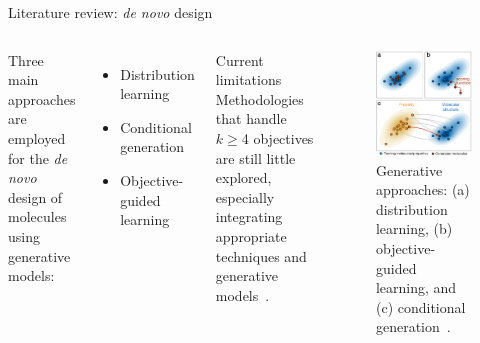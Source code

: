 \documentclass[aspectratio=169,xcolor=dvipsnames]{beamer}
\begin{document}
\begin{frame}{Literature review: \textit{de novo} design}
    \begin{columns}[c]
        Three main approaches are employed for the \textit{de novo} design of molecules using generative models:
        \begin{itemize}
            \item Distribution learning
            \item Conditional generation
            \item Objective-guided learning
        \end{itemize}
        \begin{block}{Current limitations}
            Methodologies that handle $k\geq$4 objectives are still little
            explored, especially integrating appropriate techniques and generative models~\cite{angelo2023multi}.
        \end{block}

        \begin{figure}
            \centering
            \includegraphics[width=.75\linewidth]{imgs/generation-approaches.png}
            \caption{Generative approaches: (a) distribution learning, (b) objective-guided learning, and (c) conditional generation~\cite{özçelik2025generative}.}
        \end{figure}
    \end{columns}
\end{frame}
\end{document}
